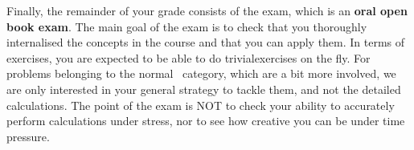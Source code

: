Finally, the remainder of your grade consists of the exam, which is an \textbf{oral open book exam}. The main goal of the exam is to check that you thoroughly internalised the concepts in the course and that you can apply them. In terms of exercises, you are expected to be able to do trivial\iconoffset\trivial exercises on the fly. For problems belonging to the normal \iconoffset\normal\, category, which are a bit more involved, we are only interested in your general strategy to tackle them, and not the detailed calculations. The point of the exam is NOT to check your ability to accurately perform calculations under stress, nor to see how creative you can be under time pressure. 

